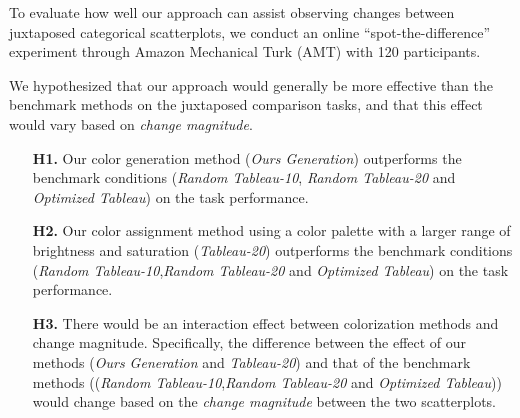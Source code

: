 To evaluate how well our approach can assist observing changes between juxtaposed categorical scatterplots, we conduct an online ``spot-the-difference'' experiment through Amazon Mechanical Turk (AMT) with 120 participants.

\vspace{.3em}
 We hypothesized that our approach would generally be more effective than the benchmark methods on the juxtaposed comparison tasks, and that this effect would vary based on \emph{change magnitude}.
\begin{itemize}[noitemsep]
\setlength{\itemsep}{5pt}
    \item[\textbf{H1.}] Our color generation method (\emph{Ours Generation}) outperforms the benchmark conditions (\emph{Random Tableau-10}, \emph{Random Tableau-20} and \emph{Optimized Tableau}) on the task performance.

    \item [\textbf{H2.}] Our color assignment method using a color palette with a larger range of brightness and saturation (\emph{Tableau-20}) outperforms the benchmark conditions (\emph{Random Tableau-10},\emph{Random Tableau-20} and \emph{Optimized Tableau}) on the task performance.

    \item [\textbf{H3.}] There would be an interaction effect between colorization methods and change magnitude. Specifically, the difference between the effect of our methods (\emph{Ours Generation} and \emph{Tableau-20}) and that of the benchmark methods ((\emph{Random Tableau-10},\emph{Random Tableau-20} and \emph{Optimized Tableau})) would change based on the \emph{change magnitude} between the two scatterplots.
\end{itemize}


